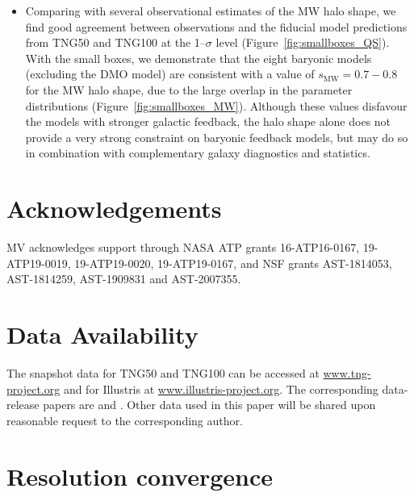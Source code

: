 \documentclass[fleqn,usenatbib]{mnras}
\begin{document}
\begin{itemize}
\item  
Comparing with several observational estimates of the MW halo shape, we find good agreement between observations and the fiducial model predictions from TNG50 and TNG100 at the 1--$\sigma$ level (Figure~\ref{fig:smallboxes_QS}).
With the small boxes, we demonstrate that the eight baryonic models (excluding the DMO model) are consistent with a value of $s_\text{MW} = 0.7-0.8$ for the MW halo shape, due to the large overlap in the parameter distributions (Figure~\ref{fig:smallboxes_MW}).
Although these values disfavour the models with stronger galactic feedback, the halo shape alone does not provide a very strong constraint on baryonic feedback models, but may do so in combination with complementary galaxy diagnostics and statistics.

\end{itemize}




\section*{Acknowledgements}

MV acknowledges support through NASA ATP grants 16-ATP16-0167, 19-ATP19-0019, 19-ATP19-0020, 19-ATP19-0167, and NSF grants AST-1814053, AST-1814259,  AST-1909831 and AST-2007355.

\section*{Data Availability}

The snapshot data for TNG50 and TNG100 can be accessed at \url{www.tng-project.org} and for Illustris at \url{www.illustris-project.org}. The corresponding data-release papers are \citealt{Nelson19TNGrelease} and \citealt{Nelson15v13}.
Other data used in this paper will be shared upon reasonable request to the corresponding author.








\appendix
\section{Resolution convergence}
\label{sec:resolution}
\end{document}

